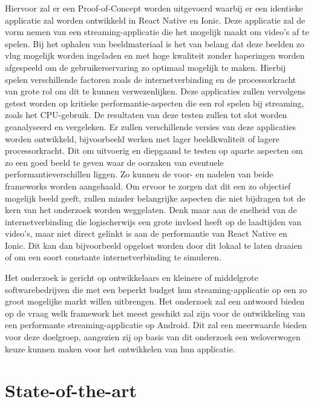 Hiervoor zal er een Proof-of-Concept worden uitgevoerd waarbij er een identieke applicatie zal worden ontwikkeld in React Native en Ionic. Deze applicatie zal de vorm nemen van een streaming-applicatie die het mogelijk maakt om video's af te spelen. Bij het ophalen van beeldmateriaal is het van belang dat deze beelden zo vlug mogelijk worden ingeladen en met hoge kwaliteit zonder haperingen worden afgespeeld om de gebruikerservaring zo optimaal mogelijk te maken. Hierbij spelen verschillende factoren zoals de internetverbinding en de processorkracht van grote rol om dit te kunnen verwezenlijken. Deze applicaties zullen vervolgens getest worden op kritieke performantie-aspecten die een rol spelen bij streaming, zoals het CPU-gebruik. De resultaten van deze testen zullen tot slot worden geanalyseerd en vergeleken. Er zullen verschillende versies van deze applicaties worden ontwikkeld, bijvoorbeeld werken met lager beeldkwaliteit of lagere processorkracht. Dit om uitvoerig en diepgaand te testen op aparte aspecten om zo een goed beeld te geven waar de oorzaken van eventuele performantieverschillen liggen. Zo kunnen de voor- en nadelen van beide frameworks worden aangehaald. Om ervoor te zorgen dat dit een zo objectief mogelijk beeld geeft, zullen minder belangrijke aspecten die niet bijdragen tot de kern van het onderzoek worden weggelaten. Denk maar aan de snelheid van de internetverbinding die logischerwijs een grote invloed heeft op de laadtijden van video's, maar niet direct gelinkt is aan de performantie van React Native en Ionic. Dit kan dan bijvoorbeeld opgelost worden door dit lokaal te laten draaien of om een soort constante internetverbinding te simuleren.

Het onderzoek is gericht op ontwikkelaars en kleinere of middelgrote softwarebedrijven die met een beperkt budget hun streaming-applicatie op een zo groot mogelijke markt willen uitbrengen. Het onderzoek zal een antwoord bieden op de vraag welk framework het meest geschikt zal zijn voor de ontwikkeling van een performante streaming-applicatie op Android. Dit zal een meerwaarde bieden voor deze doelgroep, aangezien zij op basis van dit onderzoek een weloverwogen keuze kunnen maken voor het ontwikkelen van hun applicatie.


\section{State-of-the-art}%
\label{sec:state-of-the-art}

